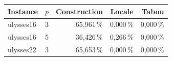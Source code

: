 \begin{tabular}{lrrrr}
\toprule
Instance & $p$ & Construction & Locale & Tabou \\
\midrule
ulysses16 & 3 & 65{,}961\,\% & 0{,}000\,\% & 0{,}000\,\% \\
ulysses16 & 5 & 36{,}426\,\% & 0{,}266\,\% & 0{,}000\,\% \\
ulysses22 & 3 & 65{,}653\,\% & 0{,}000\,\% & 0{,}000\,\% \\
\bottomrule
\end{tabular}
